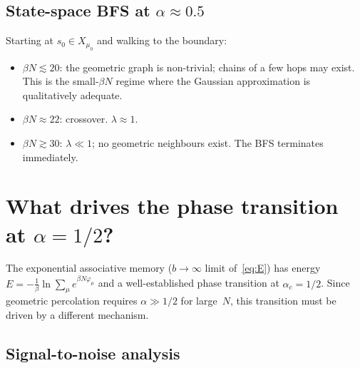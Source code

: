 \documentclass[11pt]{article}
\newcommand{\vp}{\varphi}
\begin{document}
\subsection{State-space BFS at $\alpha \approx 0.5$}

Starting at $s_0 \in X_{\mu_0}$ and walking to the boundary:
\begin{itemize}
  \item $\beta N \lesssim 20$:
    the geometric graph is non-trivial; chains of a few hops
    may exist.  This is the small-$\beta N$ regime where
    the Gaussian approximation is qualitatively adequate.
  \item $\beta N \approx 22$: crossover.  $\lambda \approx 1$.
  \item $\beta N \gtrsim 30$:
    $\lambda \ll 1$; no geometric neighbours exist.
    The BFS terminates immediately.
\end{itemize}


\section{What drives the phase transition at $\alpha = 1/2$?}
\label{sec:softmax}

The exponential associative memory
($b \to \infty$ limit of~\eqref{eq:E})
has energy $E = -\frac{1}{\beta}\ln\sum_\mu e^{\beta N\vp_\mu}$
and a well-established phase transition at $\alpha_c = 1/2$.
Since geometric percolation requires
$\alpha \gg 1/2$ for large~$N$,
this transition must be driven by a different mechanism.

\subsection{Signal-to-noise analysis}
\end{document}
